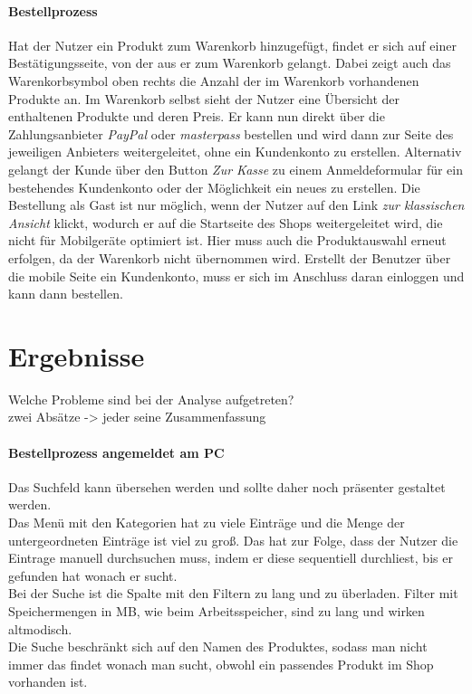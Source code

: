 \documentclass[	12pt, 
				a4paper, 
				BCOR=10mm, %
				DIV=12, 
				parskip=half, %
				headings=small, %
				twoside, %
				ngerman,
				bibliography=totoc,index=totoc, listof=totoc,
				numbers=noendperiod
				]{scrbook} %
\theoremstyle{plain}%
\theoremstyle{definition}
\theoremstyle{remark}
\begin{document}
\paragraph{Bestellprozess} Hat der Nutzer ein Produkt zum Warenkorb hinzugefügt, findet er sich auf einer Bestätigungsseite, von der aus er zum Warenkorb gelangt. Dabei zeigt auch das Warenkorbsymbol oben rechts die Anzahl der im Warenkorb vorhandenen Produkte an. Im Warenkorb selbst sieht der Nutzer eine Übersicht der enthaltenen Produkte und deren Preis. Er kann nun direkt über die Zahlungsanbieter \textit{PayPal} oder \textit{masterpass} bestellen und wird dann zur Seite des jeweiligen Anbieters weitergeleitet, ohne ein Kundenkonto zu erstellen. Alternativ gelangt der Kunde über den Button \textit{Zur Kasse} zu einem Anmeldeformular für ein bestehendes Kundenkonto oder der Möglichkeit ein neues zu erstellen. Die Bestellung als Gast ist nur möglich, wenn der Nutzer auf den Link \textit{zur klassischen Ansicht} klickt, wodurch er auf die Startseite des Shops weitergeleitet wird, die nicht für Mobilgeräte optimiert ist. Hier muss auch die Produktauswahl erneut erfolgen, da der Warenkorb nicht übernommen wird. Erstellt der Benutzer über die mobile Seite ein Kundenkonto, muss er sich im Anschluss daran einloggen und kann dann bestellen.

\section{Ergebnisse}
Welche Probleme sind bei der Analyse aufgetreten?\\
zwei Absätze -> jeder seine Zusammenfassung

\paragraph{Bestellprozess angemeldet am PC}
Das Suchfeld kann übersehen werden und sollte daher noch präsenter gestaltet werden.\\
Das Menü mit den Kategorien hat zu viele Einträge und die Menge der untergeordneten Einträge ist viel zu groß. Das hat zur Folge, dass der Nutzer die Eintrage manuell durchsuchen muss, indem er diese sequentiell durchliest, bis er gefunden hat wonach er sucht.\\
Bei der Suche ist die Spalte mit den Filtern zu lang und zu überladen. Filter mit Speichermengen in MB, wie beim Arbeitsspeicher, sind zu lang und wirken altmodisch.\\
Die Suche beschränkt sich auf den Namen des Produktes, sodass man nicht immer das findet wonach man sucht, obwohl ein passendes Produkt im Shop vorhanden ist.
\end{document}
